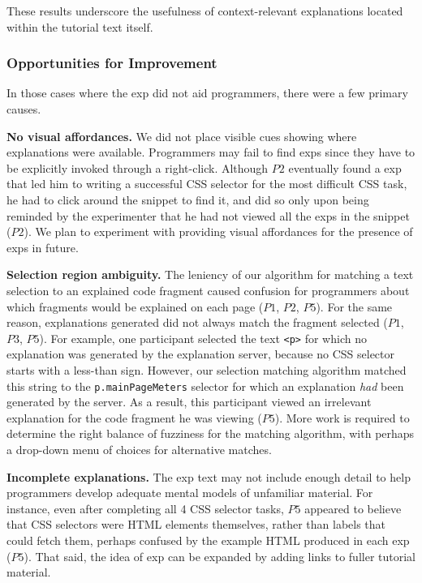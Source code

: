 These results underscore the usefulness of context-relevant explanations located within the tutorial text itself.

\subsubsection{Opportunities for Improvement}
In those cases where the \gls{exp} did not aid programmers, there were a few primary causes.

{\bf No visual affordances.} We did not place  visible cues showing where explanations were available.
Programmers may fail to find \glspl{exp} since they have to be explicitly invoked through a right-click.
Although $P2$ eventually found a \gls{exp} that led him to writing a successful CSS selector for the most difficult CSS task, he had to click around the snippet to find it, and did so only upon being reminded by the experimenter that he had not viewed all the \glspl{exp} in the snippet ($P2$).  We plan to experiment with providing visual affordances for the presence of \glspl{exp} in future.


{\bf Selection region ambiguity.}
The leniency of our algorithm for matching a text selection to an explained code fragment caused confusion for programmers about which fragments would be explained on each page ($P1$, $P2$, $P5$).
For the same reason, explanations generated did not always match the fragment selected ($P1$, $P3$, $P5$).
For example, one participant selected the text \texttt{<p>} for which no explanation was generated by the explanation server, because no CSS selector starts with a less-than sign.
However, our selection matching algorithm matched this string to the \texttt{p.mainPageMeters} selector for which an explanation \emph{had} been generated by the server.  As a result, this participant viewed an irrelevant explanation for the code fragment he was viewing ($P5$).  More work is required to determine the right balance of fuzziness for the matching algorithm, with perhaps a drop-down menu of choices for alternative matches.

{\bf Incomplete explanations.} The  \gls{exp} text may not include enough detail to help programmers  develop adequate mental models of unfamiliar material. For instance,
even after completing all 4 CSS selector tasks, $P5$ appeared to believe that CSS selectors were HTML elements themselves, rather than labels that could fetch them, perhaps confused by the example HTML produced in each \gls{exp} ($P5$).  That said, the idea of \gls{exp} can be expanded by adding links to fuller tutorial material.

